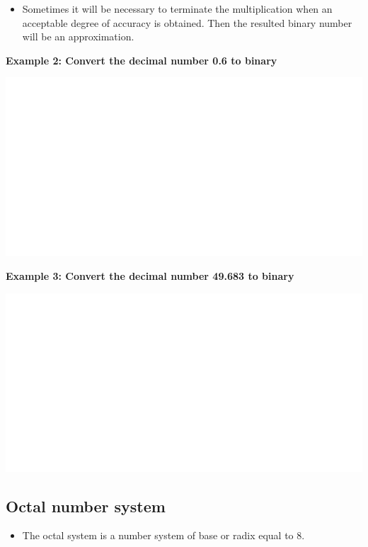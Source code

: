 \documentclass[]{book}
\providecommand{\tightlist}{%
  \setlength{\itemsep}{0pt}\setlength{\parskip}{0pt}}
\begin{document}
\begin{itemize}
\tightlist
\item
  Sometimes it will be necessary to terminate the multiplication when an acceptable degree of accuracy is obtained. Then the resulted binary number will be an approximation.
\end{itemize}

\textbf{Example 2: Convert the decimal number 0.6 to binary}

\begin{center}\includegraphics[width=1\linewidth]{figure/NSbox7-1} \end{center}

\textbf{Example 3: Convert the decimal number 49.683 to binary}

\begin{center}\includegraphics[width=1\linewidth]{figure/NSbox8-1} \end{center}

\hypertarget{octal-number-system}{%
\subsection{Octal number system}\label{octal-number-system}}

\begin{itemize}
\tightlist
\item
  The octal system is a number system of base or radix equal to 8.
\end{itemize}
\end{document}
